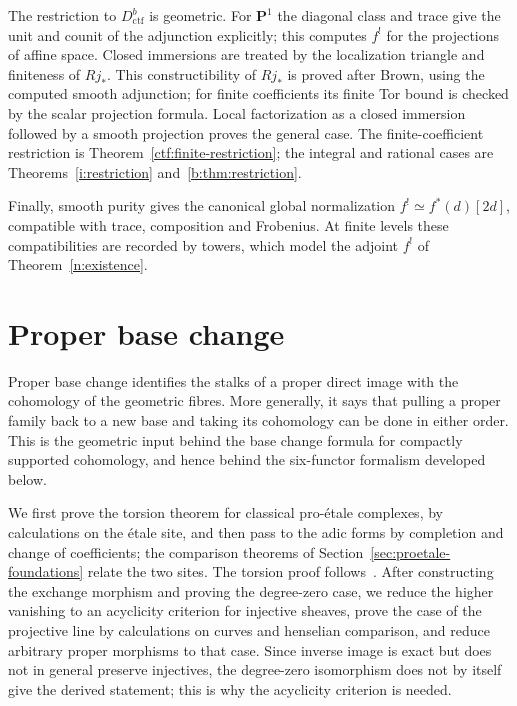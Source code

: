 \documentclass[11pt,a4paper]{article}
\numberwithin{equation}{section}
\theoremstyle{definition}
\theoremstyle{remark}
\newcommand{\Dctf}{D^b_{\mathrm{ctf}}}
\begin{document}
The restriction to $\Dctf$ is geometric. For $\mathbf P^1$ the
diagonal class and trace give the unit and counit of the adjunction
explicitly; this computes $f^!$ for the projections of affine space. Closed immersions are treated by the
localization triangle and finiteness of $Rj_*$. This constructibility
of $Rj_*$ is proved after Brown, using the computed smooth adjunction;
for finite coefficients its finite Tor bound is checked by the scalar
projection formula. Local factorization as a closed immersion followed
by a smooth projection proves the general case. The finite-coefficient
restriction is Theorem~\ref{ctf:finite-restriction}; the integral and
rational cases are Theorems~\ref{i:restriction}
and~\ref{b:thm:restriction}.

Finally, smooth purity gives the canonical global normalization
$f^!\simeq f^*(d)[2d]$, compatible with trace, composition and
Frobenius. At finite levels these compatibilities are recorded by
towers, which model the adjoint $f^!$ of Theorem~\ref{n:existence}.

\section{Proper base change}
\label{sec:proper-base-change}

Proper base change identifies the stalks of a proper direct image with
the cohomology of the geometric fibres. More generally, it says that
pulling a proper family back to a new base and taking its cohomology can
be done in either order. This is the geometric input behind the base
change formula for compactly supported cohomology, and hence behind the
six-functor formalism developed below.

We first prove the torsion theorem for classical pro-\'etale complexes,
by calculations on the \'etale site, and then pass to the adic forms by
completion and change of coefficients; the comparison theorems of
Section~\ref{sec:proetale-foundations} relate the two sites. The torsion
proof follows~\cite{BlueprintPBC}. After constructing the exchange
morphism and proving the degree-zero case, we reduce the higher
vanishing to an acyclicity criterion for injective sheaves, prove the
case of the projective line by calculations on curves and henselian
comparison, and reduce arbitrary proper morphisms to that case. Since
inverse image is exact but does not in general preserve injectives,
the degree-zero isomorphism does not by itself give the derived
statement; this is why the acyclicity criterion is needed.
\end{document}
